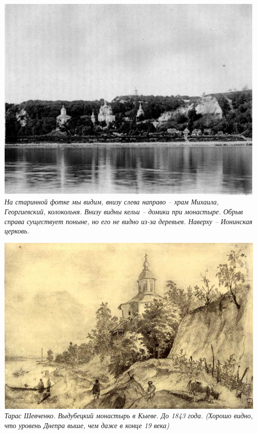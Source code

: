 \vspace*{\fill}

\begin{center}
\includegraphics[width=\linewidth]{chast-vosp/zver/vyd02.jpg}\newline
\textit{На старинной фотке мы видим, внизу слева направо – храм Михаила, Георгиевский, колокольня. Внизу видны кельи – домики при монастыре. Обрыв справа существует поныне, но его не видно из-за деревьев. Наверху – Ионинская церковь.}
\end{center}

\vspace*{\fill}

\newpage

\vspace*{\fill}
\begin{center}
\includegraphics[width=\linewidth]{chast-vosp/zver/shev-vyd-01.jpg}
\textit{Тарас Шевченко. Выдубецкий монастырь в Кыеве. До 1843 года. (Хорошо видно, что уровень Днепра выше, чем даже в конце 19 века)}
\end{center}

